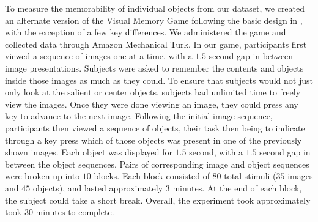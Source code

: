 To measure the memorability of individual objects from our dataset, we created an alternate version of the Visual Memory Game following the basic design in \cite{isola11}, with the exception of a few key differences. We administered the game and collected data through Amazon Mechanical Turk. In our game, participants first viewed a sequence of images one at a time, with a $1.5$ second gap in between image presentations. Subjects were asked to remember the contents and objects inside those images as much as they could. To ensure that subjects would not just only look at the salient or center objects, subjects had unlimited time to freely view the images. Once they were done viewing an image, they could press any key to advance to the next image. Following the initial image sequence, participants then viewed a sequence of objects, their task then being to indicate through a key press which of those objects was present in one of the previously shown images. Each object was displayed for $1.5$ second, with a $1.5$ second gap in between the object sequences. Pairs of corresponding image and object sequences were broken up into $10$ blocks. Each block consisted of $80$ total stimuli ($35$ images and $45$ objects), and lasted approximately $3$ minutes. At the end of each block, the subject could take a short break. Overall, the experiment took approximately took $30$ minutes to complete.


